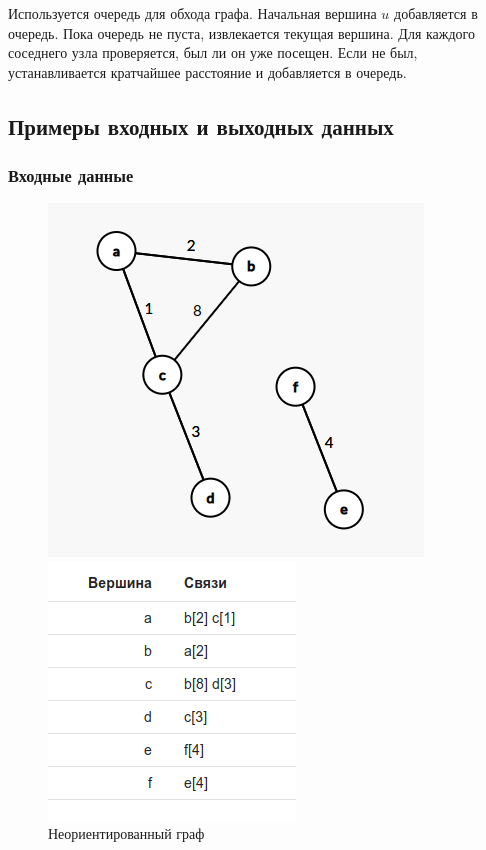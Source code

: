 Используется очередь для обхода графа. Начальная вершина $u$ добавляется в очередь.
Пока очередь не пуста, извлекается текущая вершина. Для каждого соседнего узла проверяется,
был ли он уже посещен. Если не был, устанавливается кратчайшее расстояние и добавляется в очередь.

\subsection{Примеры входных и выходных данных}
\subsubsection{Входные данные}
\begin{figure}[H]
  \begin{minipage}{0.5\textwidth}
    \centering\includegraphics[width=0.6\linewidth]{figs/task-6/graph-6.png}
  \end{minipage}
  \begin{minipage}{0.5\textwidth}
    \centering\includegraphics[width=0.6\linewidth]{figs/task-6/adj-6.png}
  \end{minipage}
  \caption{Неориентированный граф}
\end{figure}

